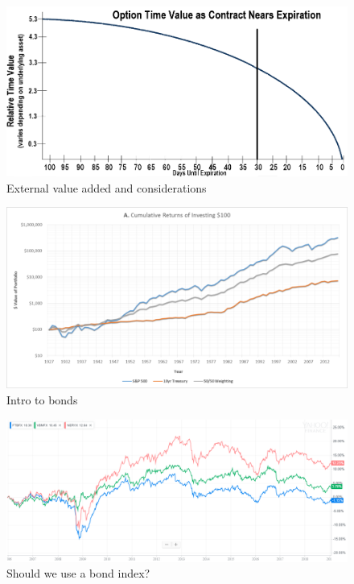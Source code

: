 \documentclass{article}
\begin{document}
\vspace{10pt}

\begin{figure}[!htb]
    \centering
    \includegraphics[width=\textwidth]{imgs/25.png}
    \caption{External value added and considerations}
\end{figure}

\vspace{10pt}

\begin{figure}[!htb]
    \centering
    \includegraphics[width=\textwidth]{imgs/26.png}
    \caption{Intro to bonds}
\end{figure}

\vspace{10pt}

\begin{figure}[!htb]
    \centering
    \includegraphics[width=\textwidth]{imgs/27.png}
    \caption{Should we use a bond index?}
\end{figure}
\end{document}
